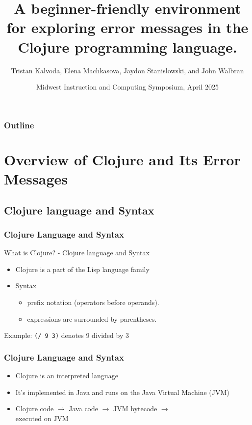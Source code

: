 \documentclass{beamer}
\newcommand{\comment}[1]{{\bf \tt  {#1}}}
\newcommand{\emcomment}[1]{\textcolor{ForestGreen}{\comment{Elena: {#1}}}}
\begin{document}
\title{A beginner-friendly environment for exploring error messages in the Clojure programming language.}
\author{Tristan Kalvoda, Elena Machkasova, Jaydon Stanislowski, and John Walbran}
\date[]  
{Midwest Instruction and Computing Symposium, April 2025}

\begin{frame}
  \titlepage
\end{frame}

\begin{frame}

  \frametitle{Outline}
\tableofcontents
\end{frame}

\section{Overview of Clojure and Its Error Messages}

\subsection{Clojure language and Syntax}
\begin{frame}
\frametitle{Clojure Language and Syntax}
What is Clojure? - Clojure language and Syntax
\begin{itemize}
  \item Clojure is a part of the Lisp language family
  \item Syntax
  \begin{itemize}
    \item prefix notation (operators before operands).
    \item expressions are surrounded by parentheses.
  \end{itemize}
\end{itemize}
Example: \texttt{(/ 9 3)} denotes 9 divided by 3
\end{frame}

\begin{frame}
  \frametitle{Clojure Language and Syntax}
  \begin{itemize}
    \item Clojure is an interpreted language
    \item It's implemented in Java and runs on the Java Virtual Machine (JVM)
    \item Clojure code \(\rightarrow\) Java code \(\rightarrow\) JVM bytecode \(\rightarrow\) \\ executed on JVM
  \end{itemize}
\end{frame}
\end{document}
